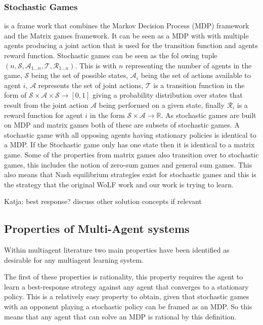 \documentclass[conference]{IEEEtran}
\newcommand\katja[1]{{\color{dark-cyan}Katja: #1}}
\begin{document}
\subsubsection{Stochastic Games} is a frame work that combines the Markov Decision Process (MDP) framework and the 
Matrix games framework. It can be seen as a MDP with with multiple agents producing 
a joint action that is used for the transition function and agents reward function. Stochastic games can be seen as the fol owing tuple $(n, \mathcal{S}, \mathcal{A}_{1...n}, 
\mathcal{T}, \mathcal{R}_{1...n})$. This is with $n$ representing the number of agents 
in the game, $\mathcal{S}$ being the set of possible states, $\mathcal{A}_{i}$ being the 
set of actions available to agent $i$, $\mathcal{A}$ represents the set of joint actions, 
$\mathcal{T}$ is a transition function in the form of 
$\mathcal{S}\times\mathcal{A}\times\mathcal{S}\rightarrow [0, 1]$ giving a probability 
distribution over states that result from the joint action $\mathcal{A}$ being performed
on a given state, finally $\mathcal{R}_{i}$ is a reward function for agent $i$ in the form
$\mathcal{S}\times\mathcal{A}\rightarrow \mathbb{R}$. As stochastic games are built on MDP and matrix games both of these are subsets of
stochastic games. A stochastic game with all opposing agents having stationary policies
is identical to a MDP. If the Stochastic game only has one state then it is identical 
to a matrix game. Some of the properties from matrix games also transition over to stochastic games, 
this includes the notion of zero-sum games and general sum games. This also means
that Nash equilibrium strategies exist for stochastic games and this is the strategy
that the original WoLF work and our work is trying to learn.

\katja{best response? discuss other solution concepts if relevant}

\subsection{Properties of Multi-Agent systems}

Within multiagent literature two main properties have
been identified as desirable for any multiagent learning
system.

The first of these properties is rationality, this property requires
the agent to learn a best-response strategy against any agent that 
converges to a stationary policy. This is a relatively easy property to 
obtain, given that stochastic games with an opponent playing a stochastic 
policy can be framed as an MDP. So this means that any agent that can 
solve an MDP is rational by this definition.
\end{document}
